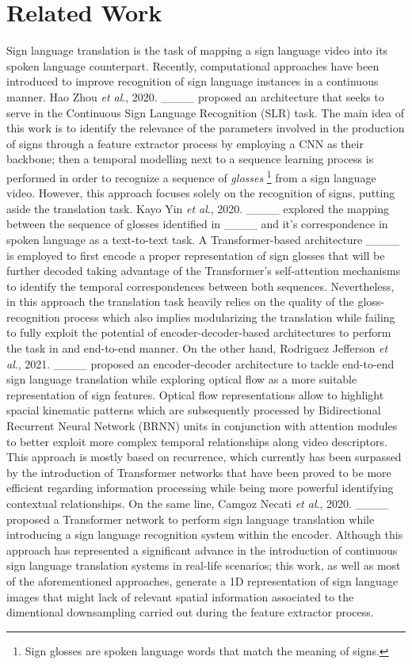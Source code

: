 \section{Related Work}
\label{sec:current_work}

Sign language translation is the task of mapping a sign language video into its spoken language counterpart. Recently, computational approaches have been introduced to improve recognition of sign language instances in a continuous manner. Hao Zhou \textit{et al}., 2020. ____ proposed an architecture that seeks to serve in the Continuous Sign Language Recognition (SLR) task. The main idea of this work is to identify the relevance of the parameters involved in the production of signs through a feature extractor process by employing a CNN as their backbone; then a temporal modelling next to a sequence learning process is performed in order to recognize a sequence of \textit{glosses} \footnote{Sign glosses are spoken language words that match the meaning of
signs.} from a sign language video. However, this approach focuses solely on the recognition of signs, putting aside the translation task. Kayo Yin \textit{et al}., 2020. ____ explored the mapping between the sequence of glosses identified in ____ and it's correspondence in spoken language as a text-to-text task. A Transformer-based architecture ____ is employed to first encode a proper representation of sign glosses that will be further decoded taking advantage of the Transformer's self-attention mechanisms to identify the temporal correspondences between both sequences. Nevertheless, in this approach the translation task heavily relies on the quality of the gloss-recognition process which also implies modularizing the translation while failing to fully exploit the potential of encoder-decoder-based architectures to perform the task in and end-to-end manner. On the other hand, Rodriguez Jefferson \textit{et al}., 2021. ____ proposed an encoder-decoder architecture to tackle end-to-end sign language translation while exploring optical flow as a more suitable representation of sign features. Optical flow representations allow to highlight spacial kinematic patterns which are subsequently processed by Bidirectional Recurrent Neural Network (BRNN) units in conjunction with attention modules to better exploit more complex temporal relationships along video descriptors. This approach is mostly based on recurrence, which currently has been surpassed by the introduction of Transformer networks that have been proved to be more efficient regarding information processing while being more powerful identifying contextual relationships. On the same line, Camgoz Necati \textit{et al}., 2020. ____ proposed a Transformer network to perform sign language translation while introducing a sign language recognition system within the encoder. Although this approach has represented a significant advance in the introduction of continuous sign language translation systems in real-life scenarios; this work, as well as most of the aforementioned approaches, generate a 1D representation of sign language images that might lack of relevant spatial information associated to the dimentional downsampling carried out during the feature extractor process.\\


